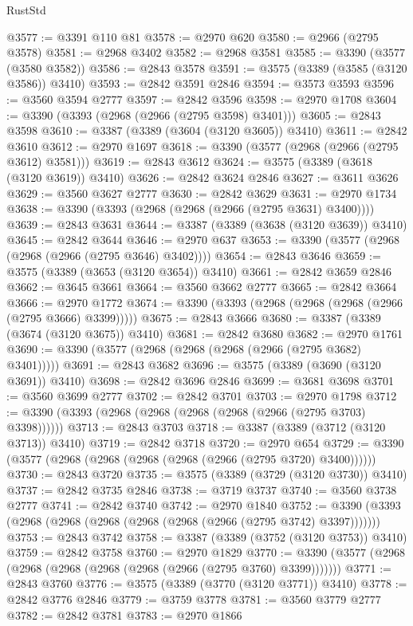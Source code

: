 \begin{lexlean}{RustStd}
\begin{coremodule}
{\begin{coremodule}
{{{{{{{{{{{{{{{{{{{{{{{{{{{{{{{{{@3577 := @3391 @110 @81
@3578 := @2970 @620
@3580 := @2966 (@2795 @3578)
@3581 := @2968 @3402
@3582 := @2968 @3581
@3585 := @3390 (@3577 (@3580 @3582))
@3586 := @2843 @3578
@3591 := @3575 (@3389 (@3585 (@3120 @3586)) @3410)
@3593 := @2842 @3591 @2846
@3594 := @3573 @3593
@3596 := @3560 @3594 @2777
@3597 := @2842 @3596
@3598 := @2970 @1708
@3604 := @3390 (@3393 (@2968 (@2966 (@2795 @3598) @3401)))
@3605 := @2843 @3598
@3610 := @3387 (@3389 (@3604 (@3120 @3605)) @3410)
@3611 := @2842 @3610
@3612 := @2970 @1697
@3618 := @3390 (@3577 (@2968 (@2966 (@2795 @3612) @3581)))
@3619 := @2843 @3612
@3624 := @3575 (@3389 (@3618 (@3120 @3619)) @3410)
@3626 := @2842 @3624 @2846
@3627 := @3611 @3626
@3629 := @3560 @3627 @2777
@3630 := @2842 @3629
@3631 := @2970 @1734
@3638 := @3390 (@3393 (@2968 (@2968 (@2966 (@2795 @3631) @3400))))
@3639 := @2843 @3631
@3644 := @3387 (@3389 (@3638 (@3120 @3639)) @3410)
@3645 := @2842 @3644
@3646 := @2970 @637
@3653 := @3390 (@3577 (@2968 (@2968 (@2966 (@2795 @3646) @3402))))
@3654 := @2843 @3646
@3659 := @3575 (@3389 (@3653 (@3120 @3654)) @3410)
@3661 := @2842 @3659 @2846
@3662 := @3645 @3661
@3664 := @3560 @3662 @2777
@3665 := @2842 @3664
@3666 := @2970 @1772
@3674 := @3390 (@3393 (@2968 (@2968 (@2968 (@2966 (@2795 @3666) @3399)))))
@3675 := @2843 @3666
@3680 := @3387 (@3389 (@3674 (@3120 @3675)) @3410)
@3681 := @2842 @3680
@3682 := @2970 @1761
@3690 := @3390 (@3577 (@2968 (@2968 (@2968 (@2966 (@2795 @3682) @3401)))))
@3691 := @2843 @3682
@3696 := @3575 (@3389 (@3690 (@3120 @3691)) @3410)
@3698 := @2842 @3696 @2846
@3699 := @3681 @3698
@3701 := @3560 @3699 @2777
@3702 := @2842 @3701
@3703 := @2970 @1798
@3712 := @3390 (@3393 (@2968 (@2968 (@2968 (@2968 (@2966 (@2795 @3703) @3398))))))
@3713 := @2843 @3703
@3718 := @3387 (@3389 (@3712 (@3120 @3713)) @3410)
@3719 := @2842 @3718
@3720 := @2970 @654
@3729 := @3390 (@3577 (@2968 (@2968 (@2968 (@2968 (@2966 (@2795 @3720) @3400))))))
@3730 := @2843 @3720
@3735 := @3575 (@3389 (@3729 (@3120 @3730)) @3410)
@3737 := @2842 @3735 @2846
@3738 := @3719 @3737
@3740 := @3560 @3738 @2777
@3741 := @2842 @3740
@3742 := @2970 @1840
@3752 := @3390 (@3393 (@2968 (@2968 (@2968 (@2968 (@2968 (@2966 (@2795 @3742) @3397)))))))
@3753 := @2843 @3742
@3758 := @3387 (@3389 (@3752 (@3120 @3753)) @3410)
@3759 := @2842 @3758
@3760 := @2970 @1829
@3770 := @3390 (@3577 (@2968 (@2968 (@2968 (@2968 (@2968 (@2966 (@2795 @3760) @3399)))))))
@3771 := @2843 @3760
@3776 := @3575 (@3389 (@3770 (@3120 @3771)) @3410)
@3778 := @2842 @3776 @2846
@3779 := @3759 @3778
@3781 := @3560 @3779 @2777
@3782 := @2842 @3781
@3783 := @2970 @1866
}}}}}}}}}}}}}}}}}}}}}}}}}}}}}}}}}
\end{coremodule}}
\end{coremodule}
\end{lexlean}
